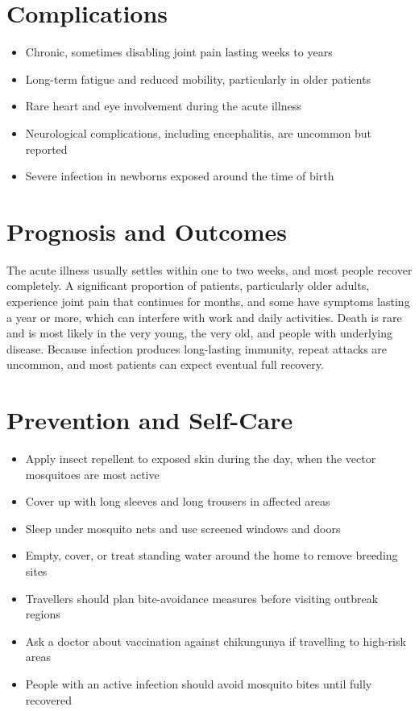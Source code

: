 \section*{Complications}
\begin{itemize}
    \item Chronic, sometimes disabling joint pain lasting weeks to years
    \item Long-term fatigue and reduced mobility, particularly in older patients
    \item Rare heart and eye involvement during the acute illness
    \item Neurological complications, including encephalitis, are uncommon but reported
    \item Severe infection in newborns exposed around the time of birth
\end{itemize}

\section*{Prognosis and Outcomes}
The acute illness usually settles within one to two weeks, and most people recover completely. A significant proportion of patients, particularly older adults, experience joint pain that continues for months, and some have symptoms lasting a year or more, which can interfere with work and daily activities. Death is rare and is most likely in the very young, the very old, and people with underlying disease. Because infection produces long-lasting immunity, repeat attacks are uncommon, and most patients can expect eventual full recovery.

\section*{Prevention and Self-Care}
\begin{itemize}
    \item Apply insect repellent to exposed skin during the day, when the vector mosquitoes are most active
    \item Cover up with long sleeves and long trousers in affected areas
    \item Sleep under mosquito nets and use screened windows and doors
    \item Empty, cover, or treat standing water around the home to remove breeding sites
    \item Travellers should plan bite-avoidance measures before visiting outbreak regions
    \item Ask a doctor about vaccination against chikungunya if travelling to high-risk areas
    \item People with an active infection should avoid mosquito bites until fully recovered
\end{itemize}


